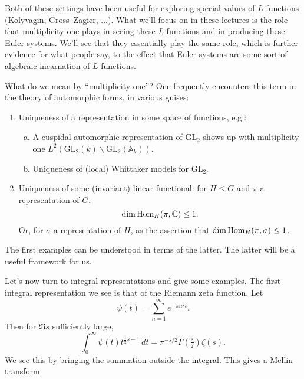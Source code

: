 \documentclass[reqno]{amsart} 
\begin{document}
Both of these settings have been useful for exploring special values of $L$-functions (Kolyvagin, Gross--Zagier, ...).  What we'll focus on in these lectures is the role that multiplicity one plays in seeing these $L$-functions and in producing these Euler systems.  We'll see that they essentially play the same role, which is further evidence for what people say, to the effect that Euler systems are some sort of algebraic incarnation of $L$-functions.

What do we mean by ``multiplicity one''?  One frequently encounters this term in the theory of automorphic forms, in various guises:
\begin{enumerate}
\item\label{enumerate:cq6r3ndbhy} Uniqueness of a representation in some space of functions, e.g.:
  \begin{enumerate}[(a)]
  \item\label{enumerate:cq6r3m96yd} A cuspidal automorphic representation of $\mathrm{GL}_2$ shows up with multiplicity one $L^2(\mathrm{GL}_2(k) \backslash \mathrm{GL}_2(\mathbb{A}_k))$.
  \item\label{enumerate:cq6r3m98gf} Uniqueness of (local) Whittaker models for $\mathrm{GL}_2$.
  \end{enumerate}
\item\label{enumerate:cq6r3ndama} Uniqueness of some (invariant) linear functional: for $H \leq G$ and $\pi$ a representation of $G$,
  \begin{equation*}
    \dim \operatorname{Hom}_H(\pi, \mathbb{C}) \leq 1.
  \end{equation*}
  Or, for $\sigma$ a representation of $H$, as the assertion that $\dim \operatorname{Hom}_H(\pi, \sigma) \leq 1$.
\end{enumerate}
The first examples can be understood in terms of the latter.  The latter will be a useful framework for us.

Let's now turn to integral representations and give some examples.  The first integral representation we see is that of the Riemann zeta function.  Let
\begin{equation}\label{eq:cq6r3qe33m}
  \psi(t) = \sum_{n = 1}^\infty e^{- \pi n^2 t}.
\end{equation}
Then for $\Re s$ sufficiently large,
\begin{equation}\label{eq:cq6r3p0tmc}
  \int_0^\infty \psi(t) t^{\frac{1}{2} s - 1} \, d t
  = \pi^{- s/2} \Gamma(\tfrac{s}{2}) \zeta(s).
\end{equation}
We see this by bringing the summation outside the integral.  This gives a Mellin transform.
\end{document}
